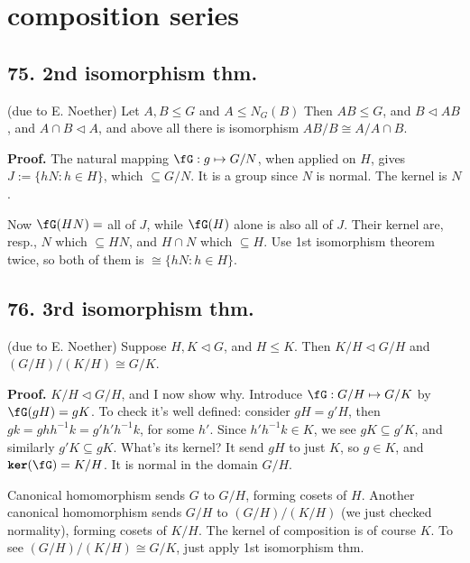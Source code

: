 \documentclass[12pt]{article}
\newcommand\Mp\mapsto%
\newcommand{\Ss}[1]{\textsf{\textbf{#1}}}%
\newcommand{\Tw}[1]{\texttt{\textbf{#1}}}%
\begin{document}
\section{composition series}
\subsection*{75. 2nd isomorphism thm.} (due to E. Noether) 
Let \(A, B \leq G\) and \(A \leq N_G(B)\)
Then \(AB \leq G\), and \(B \lhd AB\), and \(A \cap B \lhd A\), 
and above all there is isomorphism \(AB/B \cong A/A\cap B\). \par
\Ss{Proof.} The natural mapping \(\fG: g \Mp G/N\), when applied on \(H\), gives \(J:= \{hN: h \in H\}\), which \(\subseteq G/N\). 
It is a group since \(N\) is normal. 
The kernel is \(N\). \par
Now \(\fG(HN) =\) all of \(J\), while \(\fG(H)\) alone is also all of \(J\). 
Their kernel are, resp., \(N\) which \(\subseteq HN\), and \(H \cap N\) which \(\subseteq H\). 
Use 1st isomorphism theorem twice, so both of them is \(\cong \{hN: h \in H\}\). 

\subsection*{76. 3rd isomorphism thm.} (due to E. Noether) 
Suppose \(H, K \lhd G\), and \(H \leq K\). 
Then \(K/H \lhd G/H\) and \((G/H)/(K/H) \cong G/K\). \par
\Ss{Proof.} \(K/H \lhd G/H\), and I now show why. 
Introduce \(\fG: G/H \Mp G/K\) by \(\fG(gH) = gK\). 
To check it's well defined: consider \(gH = g'H\), then \(gk = ghh^{-1}k = g'h'h^{-1}k\), for some \(h'\). 
Since \(h'h^{-1}k \in K\), we see \(gK \subseteq g'K\), and similarly \(g'K \subseteq gK\). 
What's its kernel? It send \(gH\) to just \(K\), so \(g \in K\), and \(\Tw{ker}(\fG) = K/H\). 
It is normal in the domain \(G/H\). \par
Canonical homomorphism sends \(G\) to \(G/H\), forming cosets of \(H\). 
Another canonical homomorphism sends \(G/H\) to \((G/H)/(K/H)\) (we just checked normality), forming cosets of \(K/H\). 
The kernel of composition is of course \(K\). 
To see \((G/H)/(K/H) \cong G/K\), just apply 1st isomorphism thm. 
\end{document}
